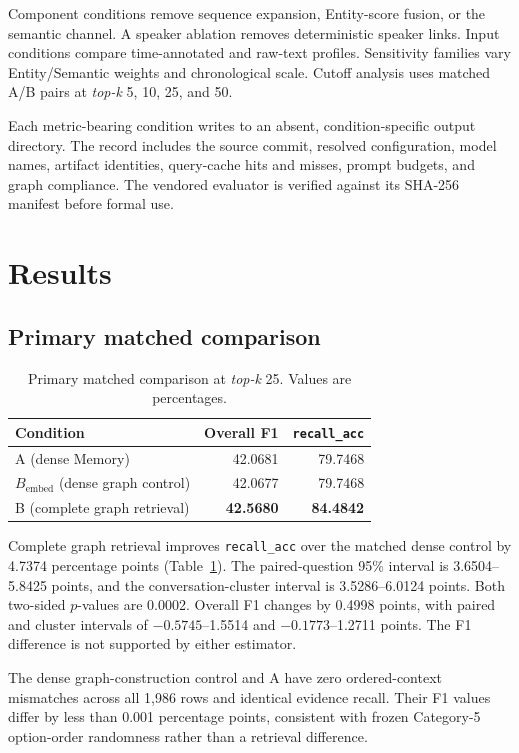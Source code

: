 \documentclass[10pt,twocolumn]{article}
\newcommand{\recallacc}{\texttt{recall\_acc}}
\newcommand{\bembed}{B_{\mathrm{embed}}}
\newcommand{\topk}{\textit{top-k}}
\begin{document}
Component conditions remove sequence expansion, Entity-score fusion, or the
semantic channel. A speaker ablation removes deterministic speaker links.
Input conditions compare time-annotated and raw-text profiles. Sensitivity
families vary Entity/Semantic weights and chronological scale. Cutoff analysis
uses matched A/B pairs at \topk{} 5, 10, 25, and 50.

Each metric-bearing condition writes to an absent, condition-specific output
directory. The record includes the source commit, resolved configuration,
model names, artifact identities, query-cache hits and misses, prompt budgets,
and graph compliance. The vendored evaluator is verified against its SHA-256
manifest before formal use.

\section{Results}

\subsection{Primary matched comparison}

\begin{table}[t]
\centering
\caption{Primary matched comparison at \topk{} 25. Values are percentages.}
\label{tab:primary}
\begin{tabular}{@{}lrr@{}}
\toprule
Condition & Overall F1 & \recallacc{} \\
\midrule
A (dense Memory) & 42.0681 & 79.7468 \\
\(\bembed\) (dense graph control) & 42.0677 & 79.7468 \\
B (complete graph retrieval) & \textbf{42.5680} & \textbf{84.4842} \\
\bottomrule
\end{tabular}
\end{table}

Complete graph retrieval improves \recallacc{} over the matched dense control
by 4.7374 percentage points (Table~\ref{tab:primary}). The paired-question
95\% interval is 3.6504--5.8425 points, and the conversation-cluster interval
is 3.5286--6.0124 points. Both two-sided \(p\)-values are 0.0002. Overall F1
changes by 0.4998 points, with paired and cluster intervals of
\(-0.5745\)--1.5514 and \(-0.1773\)--1.2711 points. The F1 difference is not
supported by either estimator.

The dense graph-construction control and A have zero ordered-context
mismatches across all 1,986 rows and identical evidence recall. Their F1
values differ by less than 0.001 percentage points, consistent with frozen
Category-5 option-order randomness rather than a retrieval difference.
\end{document}
